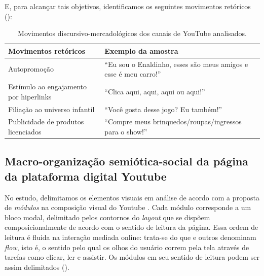 \documentclass[portuguese]{textolivre}
\begin{document}
E, para alcançar tais objetivos, identificamos os seguintes movimentos retóricos ():

\begin{table}[htbp]
\centering
\begin{threeparttable}
\caption{Movimentos discursivo-mercadológicos dos canais de YouTube analisados.}
\label{tab1}

\begin{tabularx}{\textwidth}{
>{\raggedright\arraybackslash}p{5cm}
X}
\toprule
Movimentos retóricos & Exemplo da amostra \\
\midrule

Autopromoção &
``Eu sou o Enaldinho, esses são meus amigos e esse é meu carro!'' \\

\addlinespace

Estímulo ao engajamento por hiperlinks &
``Clica aqui, aqui, aqui ou aqui!'' \\

\addlinespace

Filiação ao universo infantil &
``Você gosta desse jogo? Eu também!'' \\

\addlinespace

Publicidade de produtos licenciados &
``Compre meus brinquedos/roupas/ingressos para o show!'' \\

\bottomrule
\end{tabularx}
\end{threeparttable}
\end{table}



\subsection{Macro-organização semiótica-social da página da plataforma digital Youtube}\label{sec-formato}
No estudo, delimitamos os elementos visuais em análise de acordo com a proposta de \textit{módulos} na composição visual do Youtube \cite[p. 67]{Benson2016DiscourseYouTube}. Cada módulo corresponde a um bloco modal, delimitado pelos contornos do \textit{layout} que se dispõem composicionalmente de acordo com o sentido de leitura da página. Essa ordem de leitura é fluida na interação mediada online: trata-se do que \textcite[p. 15]{VanNoortVoorveldVanReijmersdal2012Interactivity} e outros denominam \textit{flow}, isto é, o sentido pelo qual os olhos do usuário correm pela tela através de tarefas como clicar, ler e assistir. Os módulos em seu sentido de leitura podem ser assim delimitados ().
\end{document}
